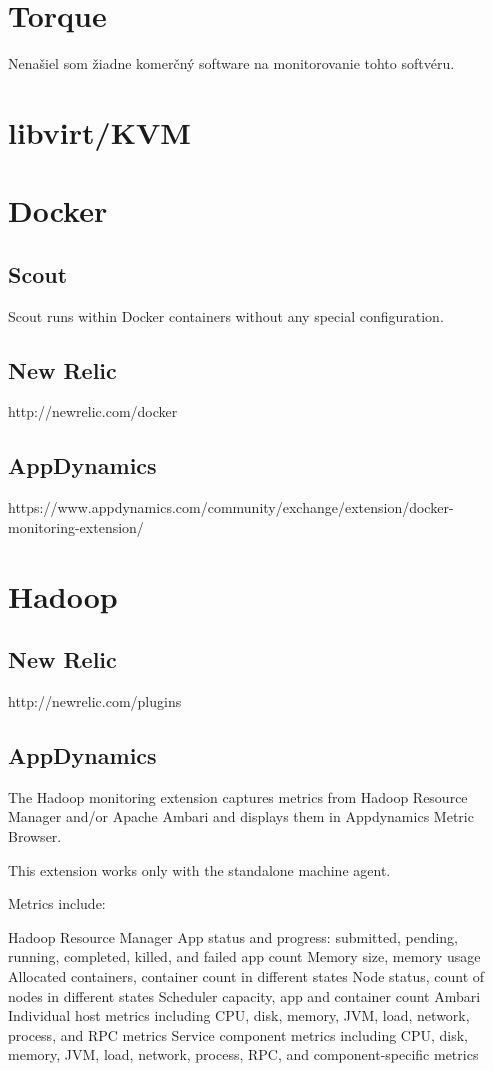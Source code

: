 \documentclass[11pt,final,oneside]{fithesis}
\begin{document}
\section{Torque}
Nenašiel som žiadne komerčný software na monitorovanie tohto softvéru. 

\section{libvirt/KVM}

\section{Docker}
\subsection{Scout}
Scout runs within Docker containers without any special configuration. \cite{scout}

\subsection{New Relic}
http://newrelic.com/docker

\subsection{AppDynamics}
https://www.appdynamics.com/community/exchange/extension/docker-monitoring-extension/


\section{Hadoop}
\subsection{New Relic}
http://newrelic.com/plugins
\subsection{AppDynamics}
The Hadoop monitoring extension captures metrics from Hadoop Resource Manager and/or Apache Ambari and displays them in Appdynamics Metric Browser.

This extension works only with the standalone machine agent.


Metrics include:

Hadoop Resource Manager
App status and progress: submitted, pending, running, completed, killed, and failed app count
Memory size, memory usage
Allocated containers, container count in different states
Node status, count of nodes in different states
Scheduler capacity, app and container count
Ambari
Individual host metrics including CPU, disk, memory, JVM, load, network, process, and RPC metrics
Service component metrics including CPU, disk, memory, JVM, load, network, process, RPC, and component-specific metrics
\end{document}
